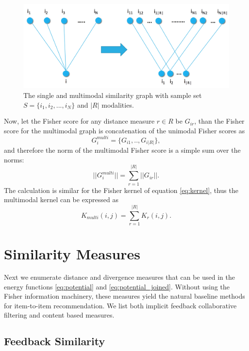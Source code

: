 \documentclass[preprint]{sig-alternate-05-2015}
\begin{document}
\begin{figure}
\centerline{
\includegraphics[scale=.2]{i2i_multi.png}}
\caption{The single and multimodal similarity graph with sample set $S=\{i_1,i_2,...,i_{N}\}$ and $|R|$ modalities.}
\label{fig:multi}
\end{figure}



Now, let the Fisher score for any distance measure $r \in R$ be $G_{ir}$, than the Fisher score for the multimodal graph is concatenation of the unimodal Fisher scores as
%
\begin{equation}
G_i^{multi} = \{G_{i1},..,G_{i|R|}\},
\nonumber
\end{equation}
%
and therefore the norm of the multimodal Fisher score is a simple sum over the norms: 
%
\begin{equation}
|| G_i^{multi}|| = \sum_{r=1}^{|R|} ||G_{ir}||.
\label{eq:fs_multi}
\end{equation}
%
The calculation is similar for the Fisher kernel of equation \eqref{eq:kernel}, thus the multimodal kernel can be expressed as
%
\begin{equation}
K_{multi}(i,j) = \sum_{r=1}^{|R|} K_r(i,j).
\label{eq:fk_multi}
\end{equation}



\section{Similarity Measures}

Next we enumerate distance and divergence measures that can be used in the energy functions \eqref{eq:potential} and \eqref{eq:potential_joined}. 
Without using the Fisher information machinery, these measures yield the natural baseline methods for item-to-item recommendation.
We list both implicit feedback collaborative filtering and content based measures.

\subsection{Feedback Similarity}
\end{document}
